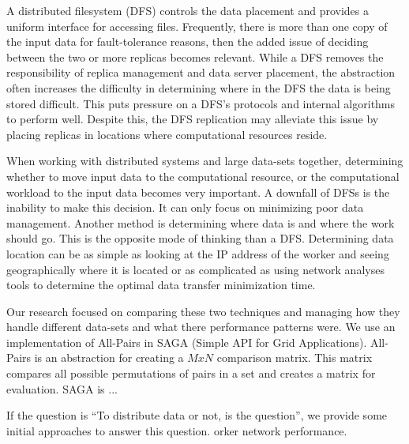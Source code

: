 \documentclass{rspublic}
\newcommand{\micnote}[1]{ {\textcolor{blue} { ***Michael: #1 }}} \else
\newcommand{\jhanote}[1]{} \newcommand{\micnote}[1]{} \newcommand{\fixme}[1]{}
\begin{document}
A distributed filesystem (DFS) controls the data placement and provides a
uniform interface for accessing files.  Frequently, there is more than one copy
of the input data for fault-tolerance reasons, then the added issue of deciding
between the two or more replicas becomes relevant.  While a DFS removes the
responsibility of replica management and data server placement, the abstraction
often increases the difficulty in determining where in the DFS the data is
being stored difficult.  This puts pressure on a DFS's protocols and internal
algorithms to perform well.  Despite this, the DFS replication may alleviate
this issue by placing replicas in locations where computational resources
reside.

When working with distributed systems and large data-sets together, determining
whether to move input data to the computational resource, or the computational
workload to the input data becomes very important.  A downfall of DFSs is the
inability to make this decision.  It can only focus on minimizing poor data
management.  Another method is determining where data is and where the work
should go.  This is the opposite mode of thinking than a DFS.  Determining data
location can be as simple as looking at the IP address of the worker and seeing
geographically where it is located or as complicated as using network analyses
tools to determine the optimal data transfer minimization time.

Our research focused on comparing these two techniques and managing how they
handle different data-sets and what there performance patterns were.  We use an
implementation of All-Pairs in SAGA (Simple API for Grid Applications).
All-Pairs is an abstraction for creating a $MxN$ comparison matrix.  This
matrix compares all possible permutations of pairs in a set and creates a
matrix for evaluation.  SAGA is ...

If the question is ``To distribute data or not, is the question'', we provide
some initial approaches to answer this question.  orker network performance.


\end{document}
